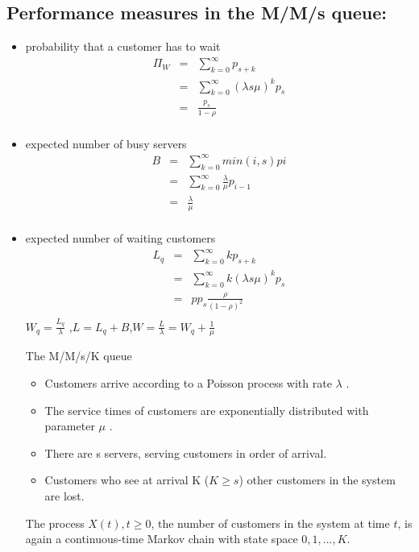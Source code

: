 \subsection*{Performance measures in the M/M/s queue:}
\begin{itemize}
\item probability that a customer has to wait
\begin{eqnarray*}
\Pi_{W} 
&=&\sum^{\infty}_{k=0} p_{s+k} \\
&=&\sum^{\infty}_{k=0} \left(\lambda s\mu \right)^kp_{s}\\
&=& \frac{p_s}{1-\rho}\\
\end{eqnarray*}
\item expected number of busy servers
\begin{eqnarray*}
B &=&\sum^{\infty}_{k=0} min(i, s) pi \\
&=&\sum^{\infty}_{k=0} \frac{\lambda}{\mu}  p_{i - 1} \\
&=&\frac{\lambda}{\mu}\\
\end{eqnarray*}
\item expected number of waiting customers
\begin{eqnarray*}
L_{q} &=& \sum^{\infty}_{k=0}k p_{s+k} \\
&=& \sum^{\infty}_{k=0} k\left(\lambda s\mu \right)^kp_{s}\\
&=& pp_{s}\frac{\rho}{(1  -  \rho )^2}\\
\end{eqnarray*}
${ \displaystyle W_{q} = \frac{L_{q}}{\lambda}}$ ,\qquad ${ \displaystyle L = L_{q} + B}$,\qquad ${ \displaystyle W = \frac{L}{\lambda } = W_{q} + \frac{1}{\mu} }$

\newpage 

The M/M/s/K queue
\begin{itemize}
\item  Customers arrive according to a Poisson process with rate $\lambda$ .
\item  The service times of customers are exponentially distributed with parameter $\mu$ .
\item  There are s servers, serving customers in order of arrival.
\item  Customers who see at arrival K ($K \geq  s$) other customers in the system
are lost.
\end{itemize}
The process ${X(t), t \geq  0}$, the number of customers in the system at time
$t$, is again a continuous-time Markov chain with state space ${0, 1, . . . , K}$.


\end{itemize}
